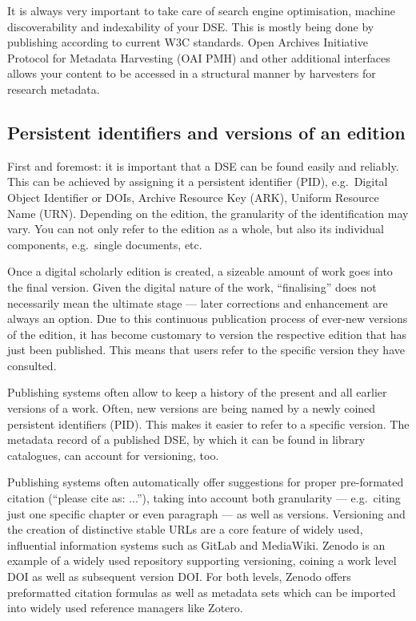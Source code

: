 \documentclass[
  letterpaper,
  DIV=11,
  numbers=noendperiod]{scrreprt}
\begin{document}
It is always very important to take care of search engine optimisation,
machine discoverability and indexability of your DSE. This is mostly
being done by publishing according to current W3C standards. Open
Archives Initiative Protocol for Metadata Harvesting (OAI PMH) and other
additional interfaces allows your content to be accessed in a structural
manner by harvesters for research metadata.

\subsection{Persistent identifiers and versions of an
edition}\label{persistent-identifiers-and-versions-of-an-edition}

First and foremost: it is important that a DSE can be found easily and
reliably. This can be achieved by assigning it a persistent identifier
(PID), e.g.~Digital Object Identifier or DOIs, Archive Resource Key
(ARK), Uniform Resource Name (URN). Depending on the edition, the
granularity of the identification may vary. You can not only refer to
the edition as a whole, but also its individual components, e.g.~single
documents, etc.

Once a digital scholarly edition is created, a sizeable amount of work
goes into the final version. Given the digital nature of the work,
``finalising'' does not necessarily mean the ultimate stage --- later
corrections and enhancement are always an option. Due to this continuous
publication process of ever-new versions of the edition, it has become
customary to version the respective edition that has just been
published. This means that users refer to the specific version they have
consulted.

Publishing systems often allow to keep a history of the present and all
earlier versions of a work. Often, new versions are being named by a
newly coined persistent identifiers (PID). This makes it easier to refer
to a specific version. The metadata record of a published DSE, by which
it can be found in library catalogues, can account for versioning, too.

Publishing systems often automatically offer suggestions for proper
pre-formated citation (``please cite as: ...''), taking into account
both granularity --- e.g.~citing just one specific chapter or even
paragraph --- as well as versions. Versioning and the creation of
distinctive stable URLs are a core feature of widely used, influential
information systems such as GitLab and MediaWiki. Zenodo is an example
of a widely used repository supporting versioning, coining a work level
DOI as well as subsequent version DOI. For both levels, Zenodo offers
preformatted citation formulas as well as metadata sets which can be
imported into widely used reference managers like Zotero.
\end{document}
